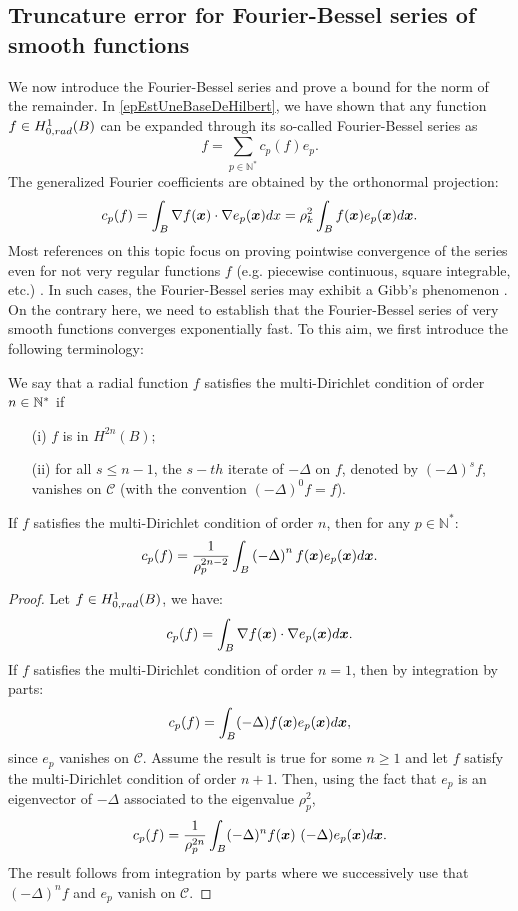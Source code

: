 \documentclass[11pt,a4paper]{article}
\begin{document}
\subsection{Truncature error for Fourier-Bessel series of smooth functions}
\label{FourierBesselTruncError}
We now introduce the Fourier-Bessel series and prove a bound for the norm of the remainder. 
In \autoref{epEstUneBaseDeHilbert}, we have shown that any function $f \in H^1_{0,rad}(B)$ can be expanded through its so-called Fourier-Bessel series as
\[f = \sum_{p\in \mathbb{N}^*}c_p(f)e_{p}.\]
The generalized Fourier coefficients are obtained by the orthonormal projection: 
\[c_p(f) = \displaystyle \int_B \nabla f(\boldsymbol{x}) \cdot \nabla e_{p}(\boldsymbol{x}) dx = \rho_k^2 \int_{B}{f(\boldsymbol{x}) e_p(\boldsymbol{x})d\boldsymbol{x}}.\]
Most references on this topic focus on proving pointwise convergence of the series even for not very regular functions $f$ (e.g. piecewise continuous, square integrable, etc.) \cite{stempak2002convergence,guadalupe1993mean,Balodis1999,colzani1993equiconvergence}.  In such cases, the Fourier-Bessel series may exhibit a Gibb's phenomenon \cite{wilton1928gibbs}. On the contrary here, we need to establish that the Fourier-Bessel series of very smooth functions converges exponentially fast. To this aim, we first introduce the following terminology: 
\begin{Def}
	We say that a radial function $f$ satisfies the multi-Dirichlet condition of order $n \in \mathbb{N}^*$ if 
	\begin{itemize}
		\item[(i)] $f$ is in $H^{2n}(B) ;$
		\item[(ii)] for all $s \leq n-1$, the $s-th$ iterate of $-\Delta$ on $f$, denoted by $(-\Delta)^s f$, vanishes on $\mathcal{C}$ (with the convention $(-\Delta)^0 f = f$). 
	\end{itemize} 
\end{Def}
\begin{Prop} 
	\label{DecroissanceFourierBessel}
	If $f$ satisfies the multi-Dirichlet condition of order $n$, then for any $p \in \mathbb{N}^*$:
	\[ c_p(f) = \dfrac{1}{\rho_{p}^{2n-2}} \int_{B}\left(-\Delta\right)^{n} f(\boldsymbol{x})e_p(\boldsymbol{x}) d\boldsymbol{x}.\] 
	\begin{proof}
		Let $f \in H^1_{0,rad}(B)$, we have:
		\[c_p(f) = \int_{B} \nabla  f(\boldsymbol{x})\cdot \nabla e_p(\boldsymbol{x})d\boldsymbol{x}. \] 
		If $f$ satisfies the multi-Dirichlet condition of order $n=1$, then by integration by parts:
		\[c_p(f) = \int_{B}(-\Delta)f(\boldsymbol{x}) e_p(\boldsymbol{x})d\boldsymbol{x},\]
		since $e_p$ vanishes on $\mathcal{C}$.
		Assume the result is true for some $n \geq 1$ and let $f$ satisfy the multi-Dirichlet condition of order $n+1$. Then, using the fact that $e_p$ is an eigenvector of $-\Delta$ associated to the eigenvalue $\rho_p^2$, 
		\[c_p(f) = \frac{1}{\rho_p^{2n}}\int_{B}(-\Delta)^{n}f(\boldsymbol{x})~ (-\Delta) e_p(\boldsymbol{x}) d\boldsymbol{x}.\]
		The result follows from integration by parts where we successively use that $(-\Delta)^{n}f$ and $e_p$ vanish on $\mathcal{C}$.
	\end{proof}
	\label{PropDecrCond}
\end{Prop}
\end{document}
